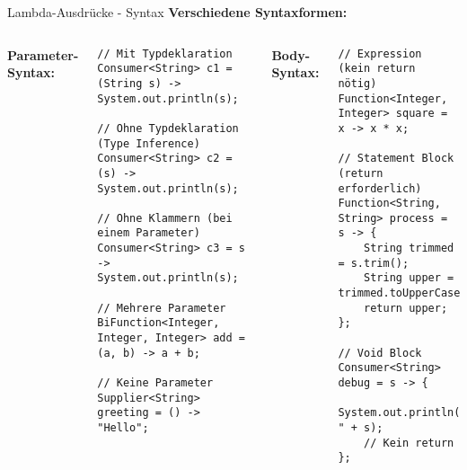 \begin{frame}[fragile]{Lambda-Ausdrücke - Syntax}
  \textbf{Verschiedene Syntaxformen:}

  \begin{columns}[T]
    \textbf{Parameter-Syntax:}
    \begin{lstlisting}[style=java, basicstyle=\tiny\ttfamily]
// Mit Typdeklaration
Consumer<String> c1 = (String s) -> System.out.println(s);

// Ohne Typdeklaration (Type Inference)
Consumer<String> c2 = (s) -> System.out.println(s);

// Ohne Klammern (bei einem Parameter)
Consumer<String> c3 = s -> System.out.println(s);

// Mehrere Parameter
BiFunction<Integer, Integer, Integer> add = (a, b) -> a + b;

// Keine Parameter
Supplier<String> greeting = () -> "Hello";
    \end{lstlisting}

    \textbf{Body-Syntax:}
    \begin{lstlisting}[style=java, basicstyle=\tiny\ttfamily]
// Expression (kein return nötig)
Function<Integer, Integer> square = x -> x * x;

// Statement Block (return erforderlich)
Function<String, String> process = s -> {
    String trimmed = s.trim();
    String upper = trimmed.toUpperCase();
    return upper;
};

// Void Block
Consumer<String> debug = s -> {
    System.out.println("Processing: " + s);
    // Kein return
};
    \end{lstlisting}
  \end{columns}
\end{frame}

